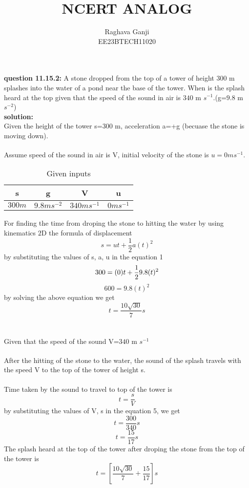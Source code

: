 \documentclass[12pt]{article}
\title{NCERT ANALOG}
\author{Raghava Ganji\\EE23BTECH11020}
\date{}
\begin{document}
\maketitle
\textbf{question 11.15.2:}
A stone dropped from the top of a tower of height $300$ m splashes into the water of a pond near the base of the tower. When is the splash heard at the top given that the speed of the sound in air is $340$ m $s^{-1}$.(g=$9.8$ m $s^{-2}$)\\
\textbf{solution:}\\
Given the height of the tower s=$300$ m, acceleration a=+g (becuase the stone is moving down).\\\\
Assume speed of the sound in air is V, initial velocity of the stone is $u=0 m s^{-1}$.
\begin{table}[H]
\centering
\begin{tabular}{|c|c|c|c|}\hline
s & g & V & u\\ \hline
$300 m$ & $9.8 m s^{-2}$ & $340 m s^{-1}$ & $0 m s^{-1}$\\ \hline
\end{tabular}
\caption{Given inputs}
\end{table}
For finding the time from droping the stone to hitting the water by using kinematics $2$D the formula of displacement 
\begin{equation}
s=ut+\frac{1}{2} a(t)^2
\end{equation}
by substituting the values of s, a, u in the equation 1
\begin{equation}
300=(0)t+\frac{1}{2} 9.8(t)^2\\
\end{equation}
\begin{equation}
600=9.8(t)^2
\end{equation}
by solving the above equation we get 
\begin{equation}
t=\frac{10\sqrt{30}}{7} s
\end{equation}\\\\
Given that the speed of the sound V=$340$ m $s^{-1}$\\\\
After the hitting of the stone to the water, the sound of the splash travels with the speed V to the top of the tower of height s.\\\\
Time taken by the sound to travel to top of the tower is\\ 
\begin{equation}
t=\frac{s}{V}
\end{equation}
by substituting the values of V, s in the equation 5, we get
\begin{equation}
t=\frac{300}{340} s
\end{equation}
\begin{equation}
t=\frac{15}{17} s
\end{equation}
The splash heard at the top of the tower after droping the stone from the top of the tower is
\begin{equation}
t=[\frac{10\sqrt{30}}{7} + \frac{15}{17}] s
\end{equation}
\end{document}
